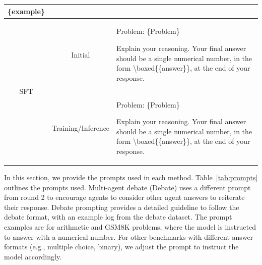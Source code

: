 \begin{table}
\begin{tabularx}{\textwidth}{c|c|X}
\{example\}
\\
\hline
\multirow{2}{*}{SFT} & Initial & Problem: \{Problem\} 

Explain your reasoning. Your final answer should be a single numerical number, in the form \textbackslash boxed\{\{answer\}\}, at the end of your response. \\
\hline
\multirow{2}{*}{RL} & Training/Inference & Problem: \{Problem\} 

Explain your reasoning. Your final answer should be a single numerical number, in the form \textbackslash boxed\{\{answer\}\}, at the end of your response.
\\
\hline
\end{tabularx}
\end{table}

In this section, we provide the prompts used in each method. Table~\ref{tab:prompts} outlines the prompts used. Multi-agent debate (Debate) uses a different prompt from round 2 to encourage agents to consider other agent answers to reiterate their response. 
Debate prompting provides a detailed guideline to follow the debate format, with an example log from the debate dataset. 
The prompt examples are for arithmetic and GSM8K problems, where the model is instructed to answer with a numerical number. For other benchmarks with different answer formats (e.g., multiple choice, binary), we adjust the prompt to instruct the model accordingly.

